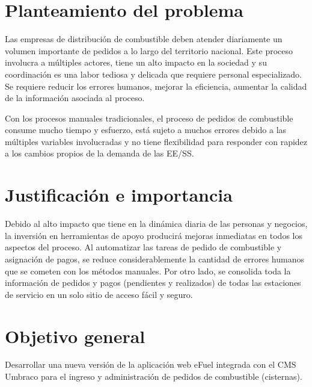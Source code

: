 \section*{Planteamiento del problema}
Las empresas de distribución de combustible deben atender diariamente un volumen importante de pedidos a lo largo del territorio nacional. Este proceso involucra a múltiples actores, tiene un alto impacto en la sociedad y su coordinación es una labor tediosa y delicada que requiere personal especializado. Se requiere reducir los errores humanos, mejorar la eficiencia, aumentar la calidad de la información asociada al proceso.

Con los procesos manuales tradicionales, el proceso de pedidos de combustible consume mucho tiempo y esfuerzo, está sujeto a muchos errores debido a las múltiples variables involucradas y no tiene flexibilidad para responder con rapidez a los cambios propios de la demanda de las \ac{EE/SS}.

\section*{Justificación e importancia}
Debido al alto impacto que tiene en la dinámica diaria de las personas y negocios, la inversión en herramientas de apoyo producirá mejoras inmediatas en todos los aspectos del proceso. Al automatizar las tareas de pedido de combustible y asignación de pagos, se reduce considerablemente la cantidad de errores humanos que se cometen con los métodos manuales. Por otro lado, se consolida toda la información de pedidos y pagos (pendientes y realizados) de todas las estaciones de servicio en un solo sitio de acceso fácil y seguro.

\section*{Objetivo general}
Desarrollar una nueva versión de la aplicación web eFuel integrada con el \ac{CMS} Umbraco \cite{umbraco} para el ingreso y administración de pedidos de combustible (cisternas).


